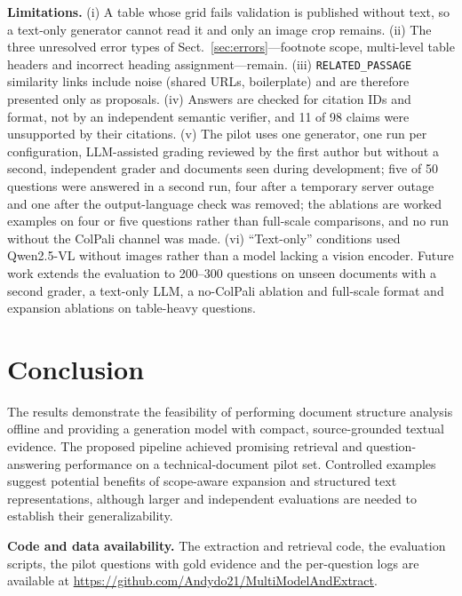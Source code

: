 \documentclass[runningheads]{llncs}
\newif\ifanon
\begin{document}
\textbf{Limitations.}\label{sec:limitations} (i) A table whose grid fails validation is published without text, so a text-only generator cannot read it and only an image crop remains. (ii) The three unresolved error types of Sect.~\ref{sec:errors}---footnote scope, multi-level table headers and incorrect heading assignment---remain. (iii) \texttt{RELATED\_PASSAGE} similarity links include noise (shared URLs, boilerplate) and are therefore presented only as proposals. (iv) Answers are checked for citation IDs and format, not by an independent semantic verifier, and 11 of 98 claims were unsupported by their citations. (v) The pilot uses one generator, one run per configuration, LLM-assisted grading reviewed by the first author but without a second, independent grader and documents seen during development; five of 50 questions were answered in a second run, four after a temporary server outage and one after the output-language check was removed; the ablations are worked examples on four or five questions rather than full-scale comparisons, and no run without the ColPali channel was made. (vi) ``Text-only'' conditions used Qwen2.5-VL without images rather than a model lacking a vision encoder. Future work extends the evaluation to 200--300 questions on unseen documents with a second grader, a text-only LLM, a no-ColPali ablation and full-scale format and expansion ablations on table-heavy questions.

\section{Conclusion}
The results demonstrate the feasibility of performing document structure analysis offline and providing a generation model with compact, source-grounded textual evidence. The proposed pipeline achieved promising retrieval and question-answering performance on a technical-document pilot set. Controlled examples suggest potential benefits of scope-aware expansion and structured text representations, although larger and independent evaluations are needed to establish their generalizability.

\ifanon
\textbf{Code and data availability.} The extraction and retrieval code, the evaluation scripts, the pilot questions with gold evidence and the per-question logs will be released in a public repository; the link is withheld for anonymous review.
\else
\textbf{Code and data availability.} The extraction and retrieval code, the evaluation scripts, the pilot questions with gold evidence and the per-question logs are available at \url{https://github.com/Andydo21/MultiModelAndExtract}.
\fi
\end{document}
